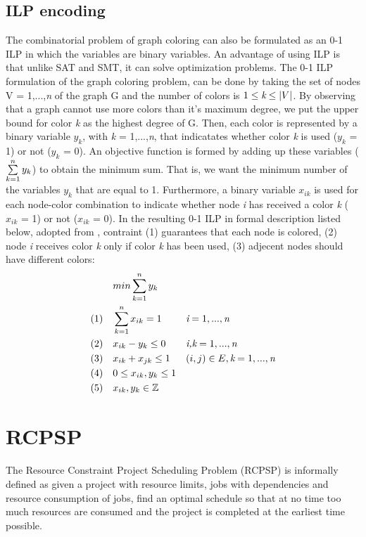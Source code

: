 \documentclass{sig-alternate}
\begin{document}
\subsection{ILP encoding}
The combinatorial problem of graph coloring can also be formulated as an 0-1 ILP in which the variables are binary variables. 
An advantage of using ILP is that unlike SAT and SMT, it can solve optimization problems. 
The 0-1 ILP formulation of the graph coloring problem,
can be done by taking the set of nodes V = {1,...,\emph{n}} of the graph G and the number of 
colors is $1 \leq \emph{k} \leq |V|$. By observing that a graph cannot use more colors than it's maximum 
degree, we put the upper bound for color \emph{k} as the highest degree of G.
Then, each color is represented by a binary variable \emph{$y_k$}, 
with \emph{k} = 1,...,\emph{n}, that indicatates whether color \emph{k} is used (\emph{$y_k$} = 1) or 
not (\emph{$y_k$} = 0). An objective function is formed by adding up these variables 
($\sum\limits_{k=1}^n \emph{$y_k$}$) to obtain the minimum sum. That is, we want the minimum number 
of the variables \emph{$y_k$} that are equal to 1. Furthermore, a binary variable \emph{$x_{ik}$} is 
used for each node-color combination to indicate whether node \emph{i} has received a color \emph{k} 
(\emph{$x_{ik}$} = 1) or not (\emph{$x_{ik}$} = 0). In the resulting 0-1 ILP in formal description 
listed below, adopted from \cite{faigle2002mathprogramming}, contraint (1) guarantees that each node 
is colored, (2) node \emph{i} receives color \emph{k} only if color \emph{k} has been used, (3) adjecent nodes should have different colors:
\begin{subequations}
\begin{align*}
        & & & min \sum\limits_{k=1}^n \emph{$y_k$} & & \\
        &  (1) & & \sum\limits_{k=1}^n \emph{$x_{ik}$} = 1 & & \emph{i} = 1,...,\emph{n} \\
        &  (2) & & \emph{$x_{ik}$} - \emph{$y_k$} \leq 0 & & \emph{i,k} = 1,...,\emph{n} \\
        &  (3) & &  \emph{$x_{ik}$} + \emph{$x_{jk}$} \leq 1 & & (i,j) \in E, \emph{k} = 1,...,\emph{n} \\
        &  (4) & & 0 \leq \emph{$x_{ik}$}, \emph{$y_k$} \leq 1 & & \\
        &  (5) & & \emph{$x_{ik}$}, \emph{$y_k$} \in \mathbb{Z} & &
\end{align*}
\end{subequations}

\section{RCPSP}
\label{sec:RCPSP}
The Resource Constraint Project Scheduling Problem (RCPSP) is informally defined as given a project with resource limits, jobs with dependencies and resource consumption of jobs, find an optimal schedule so that at no time too much resources are consumed and the project is completed at the earliest time possible.
\end{document}
